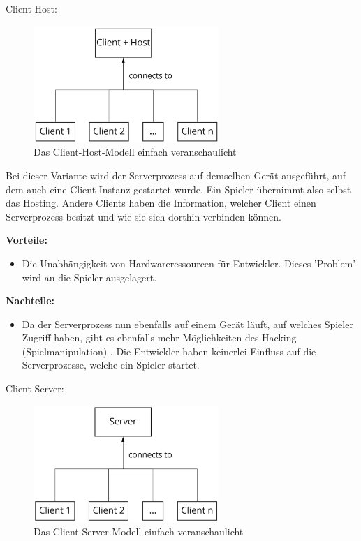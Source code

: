 \textsf{\Large Client Host:}

\begin{figure}[H]
	\centering
	\includegraphics[width=70mm]{images/Client_Host.jpg}
	\caption[Client-Server Modell]{Das Client-Host-Modell einfach veranschaulicht}
	\label{pic:Client_Host}
\end{figure}

Bei dieser Variante wird der Serverprozess auf demselben Gerät ausgeführt, auf dem auch eine Client-Instanz gestartet wurde. Ein Spieler übernimmt also selbst das Hosting. Andere Clients haben die Information, welcher Client einen Serverprozess besitzt und wie sie sich dorthin verbinden können. 

\textbf{Vorteile:}
\begin{itemize}
	\item Die Unabhängigkeit von Hardwareressourcen für Entwickler. Dieses 'Problem' wird an die Spieler ausgelagert. 
\end{itemize}

\textbf{Nachteile:} 
\begin{itemize}
	\item Da der Serverprozess nun ebenfalls auf einem Gerät läuft, auf welches Spieler Zugriff haben, gibt es ebenfalls mehr Möglichkeiten des Hacking (Spielmanipulation) \cite{Wikipedia.2021h}. Die Entwickler haben keinerlei Einfluss auf die Serverprozesse, welche ein Spieler startet. \cite{Smed.2002}
\end{itemize}

\newpage
\textsf{\Large Client Server:}

\begin{figure}[H]
\centering
\includegraphics[width=70mm]{images/Client_Server.jpg}
\caption[Client-Server Modell]{Das Client-Server-Modell einfach veranschaulicht}
\label{pic:Client_Server}
\end{figure}


